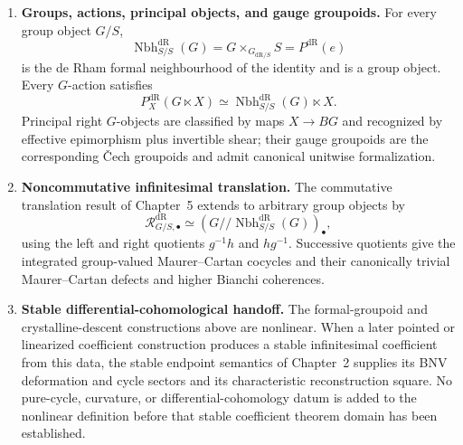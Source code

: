\begin{theorem}
\begin{enumerate}
    \item \textbf{Groups, actions, principal objects, and gauge groupoids.}
    For every group object $G/S$,
    \[
        \operatorname{Nbh}^{\mathrm{dR}}_{S/S}(G)
        =
        G\times_{G_{\mathrm{dR}/S}}S
        =
        P^{\mathrm{dR}}(e)
    \]
    is the de Rham formal neighbourhood of the identity and is a group
    object.  Every $G$-action satisfies
    \[
        P_X^{\mathrm{dR}}(G\ltimes X)
        \simeq
        \operatorname{Nbh}^{\mathrm{dR}}_{S/S}(G)\ltimes X.
    \]
    Principal right $G$-objects are classified by maps $X\to BG$ and
    recognized by effective epimorphism plus invertible shear; their gauge
    groupoids are the corresponding \v{C}ech groupoids and admit canonical
    unitwise formalization.

    \item \textbf{Noncommutative infinitesimal translation.}
    The commutative translation result of Chapter~5 extends to arbitrary
    group objects by
    \[
        \mathcal R^{\mathrm{dR}}_{G/S,\bullet}
        \simeq
        (G/\!/\operatorname{Nbh}^{\mathrm{dR}}_{S/S}(G))_\bullet,
    \]
    using the left and right quotients $g^{-1}h$ and $hg^{-1}$.  Successive
    quotients give the integrated group-valued Maurer--Cartan cocycles and
    their canonically trivial Maurer--Cartan defects and higher Bianchi coherences.

    \item \textbf{Stable differential-cohomological handoff.}
    The formal-groupoid and crystalline-descent constructions above are nonlinear.  When a
    later pointed or linearized coefficient construction produces a stable
    infinitesimal coefficient from this data, the stable endpoint semantics of
    Chapter~2 supplies its BNV deformation and cycle sectors and its
    characteristic reconstruction square.  No pure-cycle, curvature, or
    differential-cohomology datum is added to the nonlinear definition
    before that stable coefficient theorem domain has been established.
\end{enumerate}
\end{theorem}

